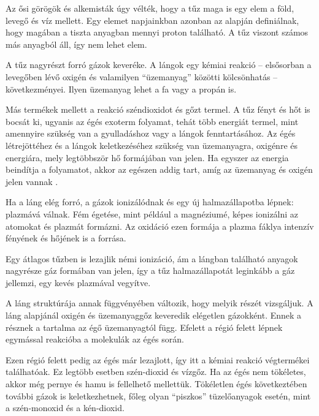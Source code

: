 

Az ősi görögök és alkemisták úgy vélték, hogy a tűz maga is egy elem a föld, levegő és víz mellett. Egy elemet napjainkban azonban az alapján definiálnak, hogy magában a tiszta anyagban mennyi proton található. A tűz viszont számos más anyagból áll, így nem lehet elem. 

A tűz nagyrészt forró gázok keveréke. A lángok egy kémiai reakció -- elsősorban a levegőben lévő oxigén és valamilyen ``üzemanyag'' közötti kölcsönhatás -- következményei. Ilyen üzemanyag lehet a fa vagy a propán is.

Más termékek mellett a reakció széndioxidot és gőzt termel. A tűz fényt és hőt is bocsát ki, ugyanis az égés exoterm folyamat, tehát több energiát termel, mint amennyire szükség van a gyulladáshoz vagy a lángok fenntartásához. Az égés létrejöttéhez és a lángok keletkezéséhez szükség van üzemanyagra, oxigénre és energiára, mely legtöbbször hő formájában van jelen. Ha egyszer az energia beindítja a folyamatot, akkor az egészen addig tart, amíg az üzemanyag és oxigén jelen vannak \cite{firePhysics2}.

Ha a láng elég forró, a gázok ionizálódnak és egy új halmazállapotba lépnek: plazmává válnak. Fém égetése, mint például a magnéziumé, képes ionizálni az atomokat és plazmát formázni. Az oxidáció ezen formája a plazma fáklya intenzív fényének és hőjének is a forrása.

Egy átlagos tűzben is lezajlik némi ionizáció, ám a lángban található anyagok nagyrésze gáz formában van jelen, így a tűz halmazállapotát leginkább a gáz jellemzi, egy kevés plazmával vegyítve.

A láng struktúrája annak függvényében változik, hogy melyik részét vizsgáljuk. A láng alapjánál oxigén és üzemanyaggőz keveredik elégetlen gázokként. Ennek a résznek a tartalma az égő üzemanyagtól függ. Efelett a régió felett lépnek egymással reakcióba a molekulák az égés során. 


Ezen régió felett pedig az égés már lezajlott, így itt a kémiai reakció végtermékei találhatóak. Ez legtöbb esetben szén-dioxid és vízgőz. Ha az égés nem tökéletes, akkor még pernye és hamu is fellelhető mellettük. Tökéletlen égés következtében további gázok is keletkezhetnek, főleg olyan ``piszkos'' tüzelőanyagok esetén, mint a szén-monoxid és a kén-dioxid.

